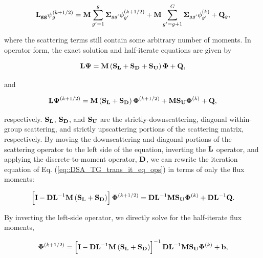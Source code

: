 \begin{equation}
\label{eq::DSA_TG_trans_it_eq}
{\bf L_{gg}} \psi_g^{(k+1/2)} = {\bf M} \sum_{g'=1}^g {\bf \Sigma}_{g g'} \phi_{g'}^{(k+1/2)} + {\bf M} \sum_{g'=g+1}^G {\bf \Sigma}_{g g'} \phi_{g'}^{(k)} + {\bf Q}_g ,
\end{equation}

\noindent where the scattering terms still contain some arbitrary number of moments. In operator form, the exact solution and half-iterate equations are given by

\begin{equation}
\label{eq::DSA_TG_trans_eq_ops}
{\bf L} {\bf \Psi} = {\bf M} \left( {\bf S_L} +  {\bf S_D} + {\bf S_U} \right) {\bf \Phi} + {\bf Q} ,
\end{equation}

\noindent and

\begin{equation}
\label{eq::DSA_TG_trans_it_eq_ops}
{\bf L} {\bf \Psi}^{(k+1/2)} = {\bf M} \left(  {\bf S_L} + {\bf S_D} \right) {\bf \Phi}^{(k+1/2)} + {\bf M} {\bf S_U} {\bf \Phi}^{(k)} + {\bf Q} ,
\end{equation}

\noindent respectively. ${\bf S_L}$, ${\bf S_D}$, and ${\bf S_U}$ are the strictly-downscattering, diagonal within-group scattering, and strictly upscattering portions of the scattering matrix, respectively. By moving the downscattering and diagonal portions of the scattering operator to the left side of the equation, inverting the ${\bf L}$ operator, and applying the discrete-to-moment operator, ${\bf D}$, we can rewrite the iteration equation of Eq. (\ref{eq::DSA_TG_trans_it_eq_ops}) in terms of only the flux moments:

\begin{equation}
\label{eq::DSA_TG_half_it}
\left[ {\bf I} - {\bf D}{\bf L}^{-1} {\bf M} \left(  {\bf S_L} + {\bf S_D} \right) \right]{\bf \Phi}^{(k+1/2)} = {\bf D}{\bf L}^{-1}  {\bf M} {\bf S_U} {\bf \Phi}^{(k)} + {\bf D}{\bf L}^{-1}  {\bf Q} .
\end{equation}

\noindent By inverting the left-side operator, we directly solve for the half-iterate flux moments,

\begin{equation}
\label{eq::DSA_TG_half_it_sol}
{\bf \Phi}^{(k+1/2)} = \left[ {\bf I} - {\bf D}{\bf L}^{-1} {\bf M} \left(  {\bf S_L} + {\bf S_D} \right) \right]^{-1} {\bf D}{\bf L}^{-1}  {\bf M} {\bf S_U} {\bf \Phi}^{(k)} + {\bf b} ,
\end{equation}

